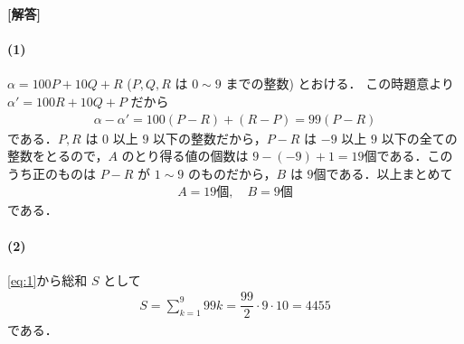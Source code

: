 \documentclass[../../main.tex]{subfiles}
\begin{document}
\begin{oframed}
  
\end{oframed}

{\bf [解答]}

\paragraph{(1)}

$\alpha = 100P + 10Q + R$ ($P, Q, R$ は $0 \sim 9$ までの整数) とおける．
この時題意より$\alpha' = 100R + 10Q + P$ だから
\begin{align}
  \alpha - \alpha'
  = 100(P - R) + (R - P)
  = 99(P - R) \label{eq:1}
\end{align}
である．$P, R$ は $0$ 以上 $9$ 以下の整数だから，$P - R$ は $-9$ 以上 $9$ 以下の全ての整数をとるので，$A$ のとり得る値の個数は $9 - (-9) + 1 = 19$個である．このうち正のものは $P - R$ が $1 \sim 9$ のものだから，$B$ は $9$個である．以上まとめて
\begin{align}
  A = 19 \text{個}, \quad
  B = 9 \text{個}
\end{align}
である．

\paragraph{(2)}

\cref{eq:1}から総和 $S$ として
\begin{align}
  S = \sum_{k=1}^9 99k = \dfrac{99}{2} \cdot 9 \cdot 10 = 4455
\end{align}
である．

\newpage
\end{document}
